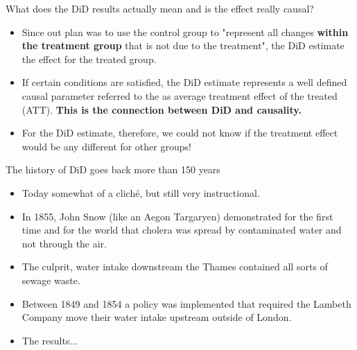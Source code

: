\documentclass[notes,11pt, aspectratio=169]{beamer}
\begin{document}
\begin{frame}{What does the DiD results actually mean and is the effect really causal?}
        \begin{itemize}        
        \item Since out plan was to use the control group to "represent all changes \textbf{within the treatment group} that is not due to the treatment", the DiD estimate the effect for the treated group. 

        \item If certain conditions are satisfied, the DiD estimate represents a well defined causal parameter referred to the as average treatment effect of the treated (ATT). \textbf{This is the connection between DiD and causality.}

        \item For the DiD estimate, therefore, we could not know if the treatment effect would be any different for other groups!        
    \end{itemize}
\end{frame}

\begin{frame}{The history of DiD goes back more than 150 years}
    \begin{itemize}
        \item Today somewhat of a cliché, but still very instructional.
        \item In 1855, John Snow (like an Aegon Targaryen) demonstrated for the first time and for the world that cholera was spread by contaminated water and not through the air. 
        \item The culprit, water intake downstream the Thames contained all sorts of sewage waste.
        \item Between 1849 and 1854 a policy was implemented that required the Lambeth Company move their water intake upstream outside of London. 
        \item The results...        
    \end{itemize}
\end{frame}
\end{document}
